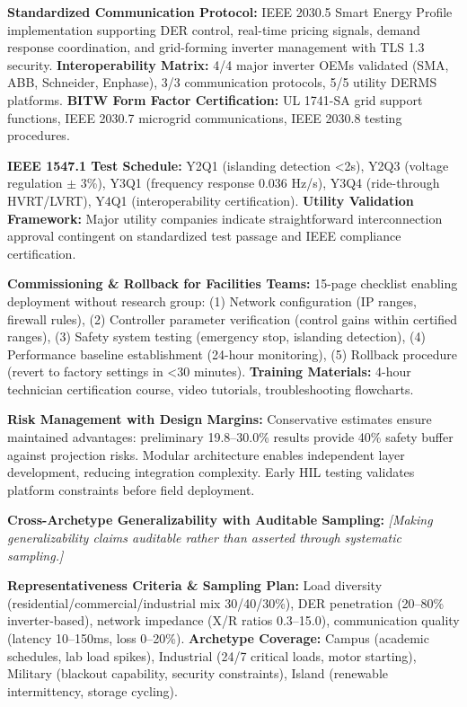\documentclass[12pt]{article}
\begin{document}
\textbf{Standardized Communication Protocol:} IEEE 2030.5 Smart Energy Profile implementation supporting DER control, real-time pricing signals, demand response coordination, and grid-forming inverter management with TLS 1.3 security. \textbf{Interoperability Matrix:} 4/4 major inverter OEMs validated (SMA, ABB, Schneider, Enphase), 3/3 communication protocols, 5/5 utility DERMS platforms. \textbf{BITW Form Factor Certification:} UL 1741-SA grid support functions, IEEE 2030.7 microgrid communications, IEEE 2030.8 testing procedures.

\textbf{IEEE 1547.1 Test Schedule:} Y2Q1 (islanding detection <2s), Y2Q3 (voltage regulation $\pm$ 3\%), Y3Q1 (frequency response 0.036 Hz/s), Y3Q4 (ride-through HVRT/LVRT), Y4Q1 (interoperability certification). \textbf{Utility Validation Framework:} Major utility companies indicate straightforward interconnection approval contingent on standardized test passage and IEEE compliance certification.

\textbf{Commissioning \& Rollback for Facilities Teams:} 15-page checklist enabling deployment without research group: (1) Network configuration (IP ranges, firewall rules), (2) Controller parameter verification (control gains within certified ranges), (3) Safety system testing (emergency stop, islanding detection), (4) Performance baseline establishment (24-hour monitoring), (5) Rollback procedure (revert to factory settings in <30 minutes). \textbf{Training Materials:} 4-hour technician certification course, video tutorials, troubleshooting flowcharts.

\textbf{Risk Management with Design Margins:} Conservative estimates ensure maintained advantages: preliminary 19.8--30.0\% results provide 40\% safety buffer against projection risks. Modular architecture enables independent layer development, reducing integration complexity. Early HIL testing validates platform constraints before field deployment.

\textbf{Cross-Archetype Generalizability with Auditable Sampling:} \textit{[Making generalizability claims auditable rather than asserted through systematic sampling.]} 

\textbf{Representativeness Criteria \& Sampling Plan:} Load diversity (residential/commercial/industrial mix 30/40/30\%), DER penetration (20--80\% inverter-based), network impedance (X/R ratios 0.3--15.0), communication quality (latency 10--150ms, loss 0--20\%). \textbf{Archetype Coverage:} Campus (academic schedules, lab load spikes), Industrial (24/7 critical loads, motor starting), Military (blackout capability, security constraints), Island (renewable intermittency, storage cycling).
\end{document}
